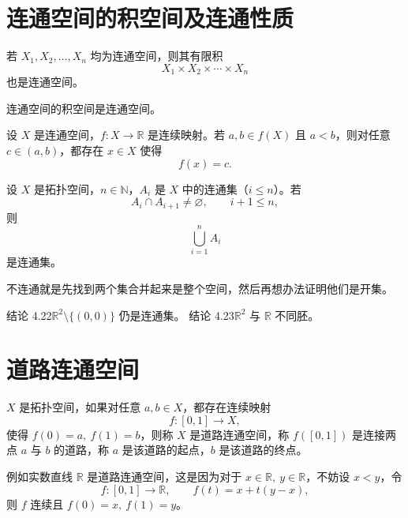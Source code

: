 \section{连通空间的积空间及连通性质}
\begin{lemma}[ 连通+有限积还是连通]
若 $X_1, X_2, \dots, X_n$ 均为连通空间，则其有限积
\[
X_1 \times X_2 \times \cdots \times X_n
\]
也是连通空间。
\end{lemma}
\begin{theorem}[无限积也是连通的]
连通空间的积空间是连通空间。
\end{theorem}
\begin{theorem}\label{thm:IVT-connected}
设 $X$ 是连通空间，$f:X\to \mathbb{R}$ 是连续映射。若 $a,b\in f(X)$ 且 $a<b$，则对任意 $c\in(a,b)$，都存在 $x\in X$ 使得
\[
f(x)=c.
\]
\end{theorem}
\begin{lemma}
设 $X$ 是拓扑空间，$n\in\mathbb{N}$，$A_i$ 是 $X$ 中的连通集（$i\le n$）。若 
\[
A_i\cap A_{i+1}\ne\varnothing,\qquad i+1\le n,
\]
则 
\[
\bigcup_{i=1}^n A_i
\]
是连通集。
\end{lemma}
\begin{note}
    不连通就是先找到两个集合并起来是整个空间，然后再想办法证明他们是开集。
\end{note}

结论 4.22\quad $\mathbb{R}^2\setminus\{(0,0)\}\text{ 仍是连通集。}$
结论 4.23\quad $\mathbb{R}^2 \text{ 与 } \mathbb{R} \text{ 不同胚。}$
\section{道路连通空间}
\begin{definition}[道路]
$X$ 是拓扑空间，如果对任意 $a,b\in X$，都存在连续映射 
\[
f:[0,1]\to X,
\]
使得 $f(0)=a,\ f(1)=b$，则称 $X$ 是道路连通空间，称 $f([0,1])$ 是连接两点 $a$ 与 $b$ 的道路，称 $a$ 是该道路的起点，$b$ 是该道路的终点。
\end{definition}

例如实数直线 $\mathbb{R}$ 是道路连通空间，这是因为对于 $x\in \mathbb{R},\ y\in \mathbb{R}$，不妨设 $x<y$，令  
\[
f:[0,1]\to \mathbb{R},\qquad f(t)=x+t(y-x),
\]
则 $f$ 连续且 $f(0)=x,\ f(1)=y$。

